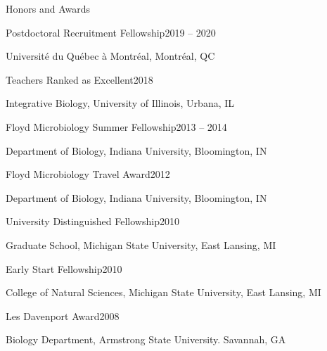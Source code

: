 \documentclass{resume} %
\begin{document}
\begin{rSection}{Honors and Awards}

    \begin{rSubsection}{Postdoctoral Recruitment Fellowship}{2019 -- 2020}{}{}
      \item Universit\'{e} du Qu\'{e}bec \`{a} Montr\'{e}al, Montr\'{e}al, QC
    \end{rSubsection}

    \begin{rSubsection}{Teachers Ranked as Excellent}{2018}{}{}
      \item Integrative Biology, University of Illinois, Urbana, IL
    \end{rSubsection}

    \begin{rSubsection}{Floyd Microbiology Summer Fellowship}{2013 -- 2014}{}{}
      \item Department of Biology, Indiana University, Bloomington, IN
    \end{rSubsection}

    \begin{rSubsection}{Floyd Microbiology Travel Award}{2012}{}{}
      \item Department of Biology, Indiana University, Bloomington, IN
    \end{rSubsection}

    \begin{rSubsection}{University Distinguished Fellowship}{2010}{}{}
      \item Graduate School, Michigan State University, East Lansing, MI
    \end{rSubsection}

    \begin{rSubsection}{Early Start Fellowship}{2010}{}{}
      \item College of Natural Sciences, Michigan State University, East
      Lansing, MI
    \end{rSubsection}

    \begin{rSubsection}{Les Davenport Award}{2008}{}{}
      \item Biology Department, Armstrong State University. Savannah, GA
    \end{rSubsection}


\end{rSection}
\end{document}
